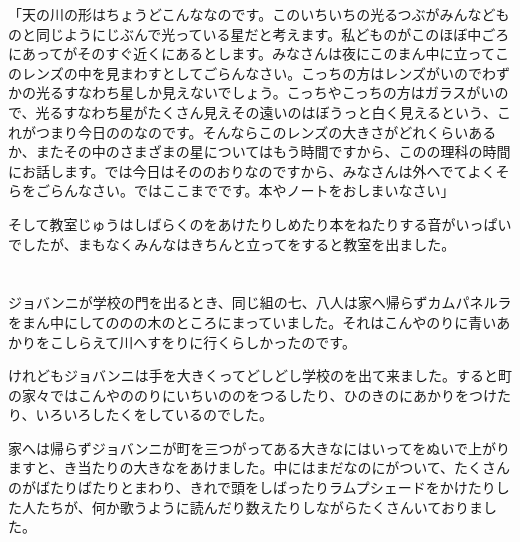 「天の川の形はちょうどこんななのです。このいちいちの光るつぶがみんなどものと同じようにじぶんで光っている星だと考えます。私どものがこのほぼ中ごろにあってがそのすぐ近くにあるとします。みなさんは夜にこのまん中に立ってこのレンズの中を見まわすとしてごらんなさい。こっちの方はレンズがいのでわずかの光るすなわち星しか見えないでしょう。こっちやこっちの方はガラスがいので、光るすなわち星がたくさん見えその遠いのはぼうっと白く見えるという、これがつまり今日ののなのです。そんならこのレンズの大きさがどれくらいあるか、またその中のさまざまの星についてはもう時間ですから、このの理科の時間にお話します。では今日はそののおりなのですから、みなさんは外へでてよくそらをごらんなさい。ではここまでです。本やノートをおしまいなさい」

そして教室じゅうはしばらくのをあけたりしめたり本をねたりする音がいっぱいでしたが、まもなくみんなはきちんと立ってをすると教室を出ました。

\chapter[活版所]{}

ジョバンニが学校の門を出るとき、同じ組の七、八人は家へ帰らずカムパネルラをまん中にしてののの木のところにまっていました。それはこんやのりに青いあかりをこしらえて川へすをりに行くらしかったのです。

けれどもジョバンニは手を大きくってどしどし学校のを出て来ました。すると町の家々ではこんやののりにいちいののをつるしたり、ひのきのにあかりをつけたり、いろいろしたくをしているのでした。

家へは帰らずジョバンニが町を三つがってある大きなにはいってをぬいで上がりますと、き当たりの大きなをあけました。中にはまだなのにがついて、たくさんのがばたりばたりとまわり、きれで頭をしばったりラムプシェードをかけたりした人たちが、何か歌うように読んだり数えたりしながらたくさんいておりました。

